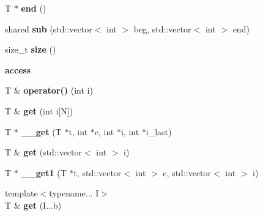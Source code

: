 \begin{DoxyCompactItemize}
\item 
\hypertarget{class____array_a0e7f0ce953b4d180a940c14e34b503db}{T $\ast$ {\bfseries end} ()}\label{class____array_a0e7f0ce953b4d180a940c14e34b503db}

\item 
\hypertarget{class____array_a0a736891406c46548f11a8707508d7c1}{shared {\bfseries sub} (std\-::vector$<$ int $>$ beg, std\-::vector$<$ int $>$ end)}\label{class____array_a0a736891406c46548f11a8707508d7c1}

\item 
\hypertarget{class____array_abbc3e2f4041747fdb3de9b224db7cb1e}{size\-\_\-t {\bfseries size} ()}\label{class____array_abbc3e2f4041747fdb3de9b224db7cb1e}

\end{DoxyCompactItemize}
\begin{Indent}{\bf access}\par
\begin{DoxyCompactItemize}
\item 
\hypertarget{class____array_a2640e620004e448f2c9d70e2d048c91e}{T \& {\bfseries operator()} (int i)}\label{class____array_a2640e620004e448f2c9d70e2d048c91e}

\item 
\hypertarget{class____array_ab8aa25dbb4bf56dd2df5dca22112deaf}{T \& {\bfseries get} (int i\mbox{[}N\mbox{]})}\label{class____array_ab8aa25dbb4bf56dd2df5dca22112deaf}

\item 
\hypertarget{class____array_a048dc1381c0a2e3b8b07d487b6e429b1}{T $\ast$ {\bfseries \-\_\-\-\_\-get} (T $\ast$t, int $\ast$c, int $\ast$i, int $\ast$i\-\_\-last)}\label{class____array_a048dc1381c0a2e3b8b07d487b6e429b1}

\item 
\hypertarget{class____array_ac7d5ddda5112a815aef1b8ac55fb3d87}{T \& {\bfseries get} (std\-::vector$<$ int $>$ i)}\label{class____array_ac7d5ddda5112a815aef1b8ac55fb3d87}

\item 
\hypertarget{class____array_a848bc4f4f32da2e95eecd3dd0e375a30}{T $\ast$ {\bfseries \-\_\-\-\_\-get1} (T $\ast$t, std\-::vector$<$ int $>$ c, std\-::vector$<$ int $>$ i)}\label{class____array_a848bc4f4f32da2e95eecd3dd0e375a30}

\item 
\hypertarget{class____array_a718b8009c814b7cfac99e4b36178cc87}{{\footnotesize template$<$typename... I$>$ }\\T \& {\bfseries get} (I...\-b)}\label{class____array_a718b8009c814b7cfac99e4b36178cc87}


\end{DoxyCompactItemize}
\end{Indent}
